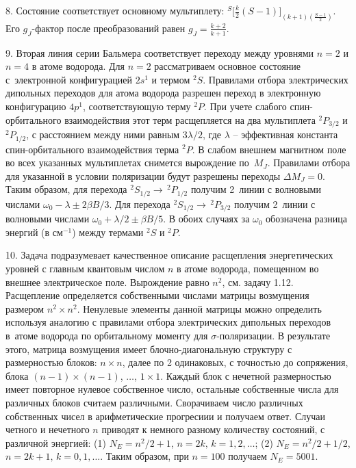 8. Состояние соответствует основному мультиплету: $^S \Big[ \frac k2 (S-1) \Big]_{(k+1)(\frac{S-1}{2})}$. Его $g_J$-фактор после преобразований равен $g_{J} = \frac{k+2}{k+1}$.\par
9. Вторая линия серии Бальмера соответствует переходу между уровнями $n=2$ и $n=4$ в атоме водорода. Для $n=2$ рассматриваем основное состояние с~электронной конфигурацией $2s^1$ и термом $^2S$. Правилами отбора электрических дипольных переходов для атома водорода разрешен переход в электронную конфигурацию $4p^1$, соответствующую терму $^2P$. При учете слабого спин-орбитального взаимодействия этот терм расщепляется на два мультиплета $^2P_{3/2}$ и $^2P_{1/2}$, с расстоянием между ними равным $3\lambda/2$, где $\lambda$ – эффективная константа спин-орбитального взаимодействия терма $^2P$. В слабом внешнем магнитном поле во всех указанных мультиплетах снимется вырождение по~$M_J$. Правилами отбора для указанной в условии поляризации будут разрешены переходы $\Delta M_J = 0$. Таким образом, для перехода $^2S_{1/2} \rightarrow\,^2P_{1/2}$ получим 2~линии с волновыми числами $\omega_{0}-\lambda \pm 2\beta 
B/3$. Для перехода $^2S_{1/2} \rightarrow \,^2P_{3/2}$ получим 2~линии с волновыми числами $\omega_{0}+\lambda/2 \pm \beta B/5$. В обоих случаях за $\omega_{0}$ обозначена разница энергий (в см$^{-1}$) между термами $^2S$ и $^2P$.\par
10. Задача подразумевает качественное описание расщепления энергетических уровней с главным квантовым числом $n$ в атоме водорода, помещенном во внешнее электрическое поле. Вырождение равно $n^2$, см. задачу 1.12. Расщепление определяется собственными числами матрицы возмущения размером $n^2 \times  n^2$. Ненулевые элементы данной матрицы можно определить используя аналогию с правилами отбора электрических дипольных переходов в~атоме водорода по орбитальному моменту для $\sigma$-поляризации. В результате этого, матрица возмущения имеет блочно-диагональную структуру с размерностью блоков: $n \times n$, далее по 2 одинаковых, с точностью до сопряжения, блока $(n-1) \times (n-1)$, $\ldots$, $1 \times 1$.  Каждый блок с нечетной размерностью имеет повторное нулевое собственное число, остальные собственные числа для различных блоков считаем различными. Сворачиваем число различных собственных чисел в арифметические прогресиии и получаем ответ. Случаи четного и нечетного $n$ приводят к немного разному количеству состояний, с различной энергией:  (1) $N_E=n^2  / 2 + 1$, $n=2k,\,k=1,2,\ldots$; (2) $N_E=n^2  / 2 + 1/2$, $n=2k+1,\,k=0,1,\ldots$. Таким образом, при $n = 100$ получаем $N_E=5001$. \par
